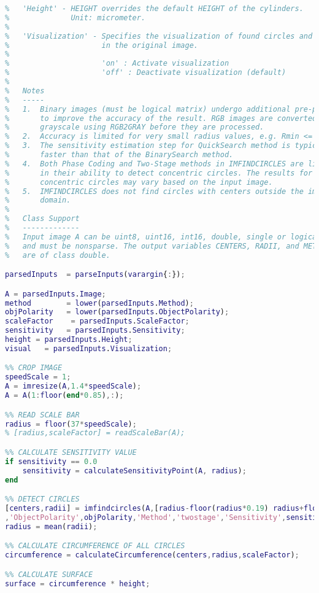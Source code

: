 \begin{lstlisting}[language=MATLAB, caption=Verfeinerung der lokalen Minima, label=lst:calculateSurfaceByDIP]
%
%   'Height' - HEIGHT overrides the default HEIGHT of the cylinders.
%              Unit: micrometer.
%
%   'Visualization' - Specifies the visualization of found circles and arcs
%                     in the original image.
%
%                     'on' : Activate visualization
%                     'off' : Deactivate visualization (default)
%
%   Notes
%   -----
%   1.  Binary images (must be logical matrix) undergo additional pre-processing
%       to improve the accuracy of the result. RGB images are converted to
%       grayscale using RGB2GRAY before they are processed.
%   2.  Accuracy is limited for very small radius values, e.g. Rmin <= 5.
%   3.  The sensitivity estimation step for QuickSearch method is typically
%       faster than that of the BinarySearch method.
%   4.  Both Phase Coding and Two-Stage methods in IMFINDCIRCLES are limited
%       in their ability to detect concentric circles. The results for
%       concentric circles may vary based on the input image.
%   5.  IMFINDCIRCLES does not find circles with centers outside the image
%       domain.
%
%   Class Support
%   -------------
%   Input image A can be uint8, uint16, int16, double, single or logical,
%   and must be nonsparse. The output variables CENTERS, RADII, and METRIC
%   are of class double.

parsedInputs  = parseInputs(varargin{:});

A = parsedInputs.Image;
method        = lower(parsedInputs.Method);
objPolarity   = lower(parsedInputs.ObjectPolarity);
scaleFactor    = parsedInputs.ScaleFactor;
sensitivity   = parsedInputs.Sensitivity;
height = parsedInputs.Height;
visual   = parsedInputs.Visualization;

%% CROP IMAGE 
speedScale = 1;
A = imresize(A,1.4*speedScale);
A = A(1:floor(end*0.85),:);

%% READ SCALE BAR
radius = floor(37*speedScale);
% [radius,scaleFactor] = readScaleBar(A);

%% CALCULATE SENSITIVITY VALUE
if sensitivity == 0.0
    sensitivity = calculateSensitivityPoint(A, radius);   
end

%% DETECT CIRCLES
[centers,radii] = imfindcircles(A,[radius-floor(radius*0.19) radius+floor(radius*0.19)] ...
,'ObjectPolarity',objPolarity,'Method','twostage','Sensitivity',sensitivity);
radius = mean(radii);

%% CALCULATE CIRCUMFERENCE OF ALL CIRCLES
circumference = calculateCircumference(centers,radius,scaleFactor);

%% CALCULATE SURFACE
surface = circumference * height;


\end{lstlisting}

